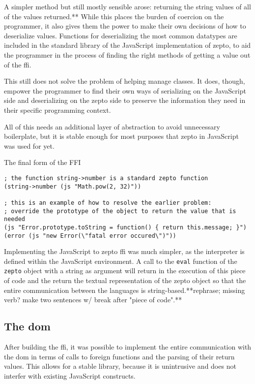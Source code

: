 \documentclass[oneside,11pt,xetex]{scrbook}
\begin{document}
A simpler method but still mostly sensible arose: returning the string
values of all of the values returned.** While this places the burden of coercion
on the programmer, it also gives them the power to make their own 
decisions of how to deserialize values. Functions for deserializing the most
common datatypes are included in the standard library of the JavaScript
implementation of zepto, to aid the programmer in the process of finding
the right methods of getting a value out of the \gls{ffi}.

This still does not solve the problem of helping manage classes. It does, though, empower
the programmer to find their own ways of serializing on the JavaScript side
and deserializing on the zepto side to preserve the information they need in
their specific programming context.

All of this needs an additional layer of abstraction to avoid unnecessary
boilerplate, but it is stable enough for most purposes that zepto in JavaScript
was used for yet.

\begin{listing}[H]
\caption{The final form of the FFI}
\begin{verbatim}
; the function string->number is a standard zepto function
(string->number (js "Math.pow(2, 32)"))

; this is an example of how to resolve the earlier problem:
; override the prototype of the object to return the value that is needed
(js "Error.prototype.toString = function() { return this.message; }")
(error (js "new Error(\"fatal error occured\")"))
\end{verbatim}
\end{listing}

Implementing the JavaScript to zepto \gls{ffi} was much simpler, as the
interpreter is defined within the JavaScript environment. A call to the
\texttt{eval} function of the \texttt{zepto} object with a string as argument
will return in the execution of this piece of code and the return the textual
representation of the zepto object so that the entire communication between
the languages is string-based.**rephrase; missing verb? make two sentences w/ break after "piece of code".**

\subsection{The \gls{dom}}

After building the \gls{ffi}, it was possible to implement the entire
communication with the \gls{dom} in terms of calls to foreign functions
and the parsing of their return values. This allows for a stable library,
because it is unintrusive and does not interfer with existing JavaScript
constructs.
\end{document}
